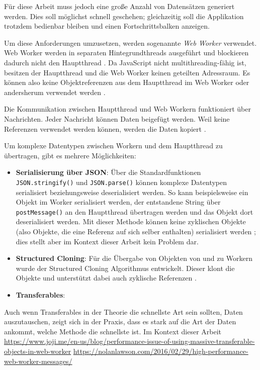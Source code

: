 Für diese Arbeit muss jedoch eine große Anzahl von Datensätzen generiert werden. Dies soll möglichst schnell geschehen; gleichzeitig soll die Applikation trotzdem bedienbar bleiben und einen Fortschrittsbalken anzeigen.

Um diese Anforderungen umzusetzen, werden sogenannte \textit{Web Worker} verwendet. Web Worker werden in separaten Hintegrundthreads ausgeführt und blockieren dadurch nicht den Hauptthread \cite{mdn:webworkers}. Da JavaScript nicht multithreading-fähig ist, besitzen der Hauptthread und die Web Worker keinen geteilten Adressraum. Es können also keine Objektreferenzen aus dem Hauptthread im Web Worker oder andersherum verwendet werden \cite{mdn:webworkers}.

Die Kommunikation zwischen Hauptthread und Web Workern funktioniert über Nachrichten. Jeder Nachricht können Daten beigefügt werden. Weil keine Referenzen verwendet werden können, werden die Daten kopiert \cite{mdn:webworkers}.

Um komplexe Datentypen zwischen Workern und dem Hauptthread zu übertragen, gibt es mehrere Möglichkeiten:
\begin{itemize}
    \item \textbf{Serialisierung über JSON}: Über die Standardfunktionen \texttt{JSON.stringify()} und \texttt{JSON.parse()} können komplexe Datentypen serialisiert beziehungsweise deserialisiert werden. So kann beispielsweise ein Objekt im Worker serialisiert werden, der entstandene String über \texttt{postMessage()} an den Hauptthread übertragen werden und das Objekt dort deserialisiert werden. Mit dieser Methode können keine zyklischen Objekte (also Objekte, die eine Referenz auf sich selber enthalten) serialisiert werden \cite{mdn:json_stringify}; dies stellt aber im Kontext dieser Arbeit kein Problem dar.
    \item \textbf{Structured Cloning}: Für die Übergabe von Objekten von und zu Workern wurde der Structured Cloning Algorithmus entwickelt. Dieser klont die Objekte und unterstützt dabei auch zyklische Referenzen \cite{mdn:structured_cloning}.
    \item \textbf{Transferables}:
\end{itemize}

Auch wenn Transferables in der Theorie die schnellste Art sein sollten, Daten auszutauschen, zeigt sich in der Praxis, dass es stark auf die Art der Daten ankommt, welche Methode die schnellste ist. Im Kontext dieser Arbeit 
\url{https://www.joji.me/en-us/blog/performance-issue-of-using-massive-transferable-objects-in-web-worker}
\url{https://nolanlawson.com/2016/02/29/high-performance-web-worker-messages/}

